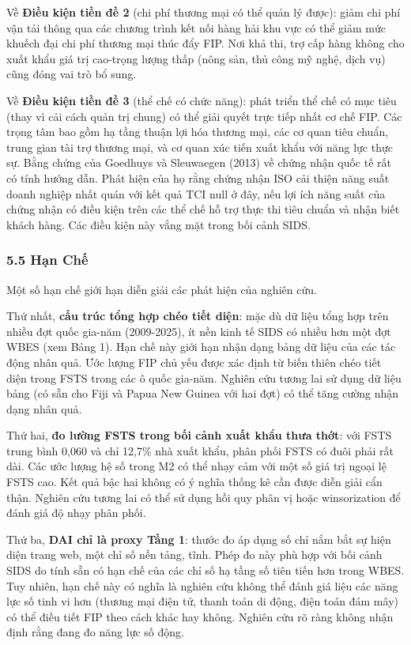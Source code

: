 \documentclass[12pt,a4paper]{article}
\begin{document}
Về \textbf{Điều kiện tiền đề 2} (chi phí thương mại có thể quản lý
được): giảm chi phí vận tải thông qua các chương trình kết nối hàng hải
khu vực có thể giảm mức khuếch đại chi phí thương mại thúc đẩy FIP. Nơi
khả thi, trợ cấp hàng không cho xuất khẩu giá trị cao-trọng lượng thấp
(nông sản, thủ công mỹ nghệ, dịch vụ) cũng đóng vai trò bổ sung.

Về \textbf{Điều kiện tiền đề 3} (thể chế có chức năng): phát triển thể
chế có mục tiêu (thay vì cải cách quản trị chung) có thể giải quyết trực
tiếp nhất cơ chế FIP. Các trọng tâm bao gồm hạ tầng thuận lợi hóa thương
mại, các cơ quan tiêu chuẩn, trung gian tài trợ thương mại, và cơ quan
xúc tiến xuất khẩu với năng lực thực sự. Bằng chứng của Goedhuys và
Sleuwaegen (2013) về chứng nhận quốc tế rất có tính hướng dẫn. Phát hiện
của họ rằng chứng nhận ISO cải thiện năng suất doanh nghiệp nhất quán
với kết quả TCI null ở đây, nếu lợi ích năng suất của chứng nhận có điều
kiện trên các thể chế hỗ trợ thực thi tiêu chuẩn và nhận biết khách
hàng. Các điều kiện này vắng mặt trong bối cảnh SIDS.

\hypertarget{55-hux1ea1n-chux1ebf}{%
\subsubsection{5.5 Hạn Chế}\label{55-hux1ea1n-chux1ebf}}

Một số hạn chế giới hạn diễn giải các phát hiện của nghiên cứu.

Thứ nhất, \textbf{cấu trúc tổng hợp chéo tiết diện}: mặc dù dữ liệu tổng
hợp trên nhiều đợt quốc gia-năm (2009-2025), ít nền kinh tế SIDS có
nhiều hơn một đợt WBES (xem Bảng 1). Hạn chế này giới hạn nhận dạng bảng
dữ liệu của các tác động nhân quả. Ước lượng FIP chủ yếu được xác định
từ biến thiên chéo tiết diện trong FSTS trong các ô quốc gia-năm. Nghiên
cứu tương lai sử dụng dữ liệu bảng (có sẵn cho Fiji và Papua New Guinea
với hai đợt) có thể tăng cường nhận dạng nhân quả.

Thứ hai, \textbf{đo lường FSTS trong bối cảnh xuất khẩu thưa thớt}: với
FSTS trung bình 0,060 và chỉ 12,7\% nhà xuất khẩu, phân phối FSTS có
đuôi phải rất dài. Các ước lượng hệ số trong M2 có thể nhạy cảm với một
số giá trị ngoại lệ FSTS cao. Kết quả bậc hai không có ý nghĩa thống kê
cần được diễn giải cẩn thận. Nghiên cứu tương lai có thể sử dụng hồi quy
phân vị hoặc winsorization để đánh giá độ nhạy phân phối.

Thứ ba, \textbf{DAI chỉ là proxy Tầng 1}: thước đo áp dụng số chỉ nắm
bắt sự hiện diện trang web, một chỉ số nền tảng, tĩnh. Phép đo này phù
hợp với bối cảnh SIDS do tính sẵn có hạn chế của các chỉ số hạ tầng số
tiên tiến hơn trong WBES. Tuy nhiên, hạn chế này có nghĩa là nghiên cứu
không thể đánh giá liệu các năng lực số tinh vi hơn (thương mại điện tử,
thanh toán di động, điện toán đám mây) có thể điều tiết FIP theo cách
khác hay không. Nghiên cứu rõ ràng không nhận định rằng đang đo năng lực
số động.
\end{document}
